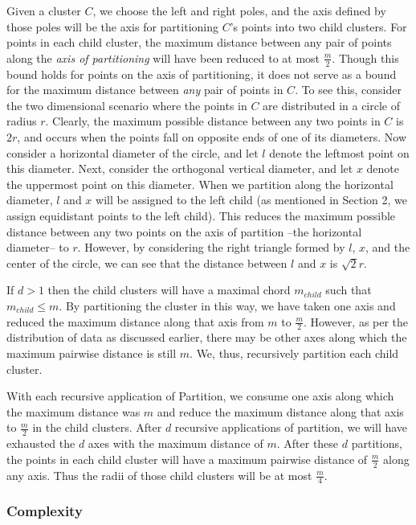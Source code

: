 Given a cluster $C$, we choose the left and right poles, 
and the axis defined by those poles will be the axis for partitioning  $C$'s points into two child clusters.
For points in each child cluster, the maximum distance between any pair of points along the \emph{axis of partitioning} will have been reduced to at most $\frac{m}{2}$.
Though this bound holds for points on the axis of partitioning, it does not serve as a bound for the maximum distance between \emph{any} pair of points in  $C$.
To see this, consider the two dimensional scenario where the points in  $C$ are distributed in a circle of radius $r$. Clearly, the maximum possible distance between 
any two points in  $C$ is $2r$, and occurs when the points fall on opposite ends of one of its diameters. Now consider a horizontal diameter of the circle, 
and let $l$ denote the leftmost point on this diameter. Next, consider the orthogonal vertical diameter, and let $x$ denote the uppermost point on this diameter. When we 
partition along the horizontal diameter, $l$ and $x$ will be assigned to the left child (as mentioned in Section 2, we assign equidistant points to the left child). 
This reduces the maximum possible distance between any two points on the axis of partition --the horizontal diameter-- to $r$. However, by considering the 
right triangle formed by $l$, $x$, and the center of the circle, we can see that the distance between 
$l$ and $x$ is $\sqrt{2}{r}$.


If $d > 1$ then the child clusters will have a maximal chord $m_{child}$ such that $m_{child} \leq m$.
By partitioning the cluster in this way, we have taken one axis and reduced the maximum distance along that axis from $m$ to $\frac{m}{2}$.
However, as per the distribution of data as discussed earlier, there may be other axes along which the maximum pairwise distance is still $m$.
We, thus, recursively partition each child cluster.

With each recursive application of Partition, we consume one axis along which the maximum distance was $m$ and reduce the maximum distance along that axis to $\frac{m}{2}$ in the child clusters.
After $d$ recursive applications of partition, we will have exhausted the $d$ axes with the maximum distance of $m$.
After these $d$ partitions, the points in each child cluster will have a maximum pairwise distance of $\frac{m}{2}$ along any axis.
Thus the radii of those child clusters will be at most $\frac{m}{4}$.

\subsubsection {Complexity}
\label{subsubsec:methods:clustering:complexity}

